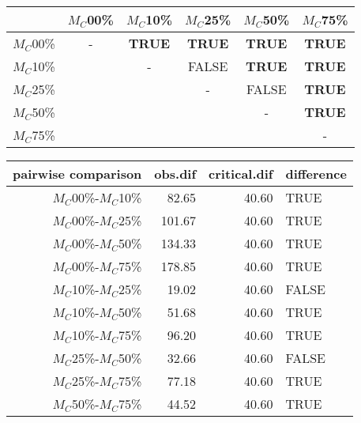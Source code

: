 \begin{tabular}{c|ccccc}
    \hline
              & $M_C$00\% & $M_C$10\% & $M_C$25\% & $M_C$50\% & $M_C$75\% \\
    \hline
    $M_C$00\% & - & \textbf{TRUE} & \textbf{TRUE} & \textbf{TRUE} & \textbf{TRUE}\\
    $M_C$10\% & & - & FALSE & \textbf{TRUE} & \textbf{TRUE} \\
    $M_C$25\% & & & - & FALSE & \textbf{TRUE} \\
    $M_C$50\% & & & & - & \textbf{TRUE} \\
    $M_C$75\% & & & & & - \\
    \hline
\end{tabular}
\centering
\begin{tabular}{rrrl}
 pairwise comparison & obs.dif & critical.dif & difference \\ 
  \hline
  $M_C$00\%-$M_C$10\% & 82.65 & 40.60 & TRUE \\ 
  $M_C$00\%-$M_C$25\% & 101.67 & 40.60 & TRUE \\
  $M_C$00\%-$M_C$50\% & 134.33 & 40.60 & TRUE \\ 
  $M_C$00\%-$M_C$75\% & 178.85 & 40.60 & TRUE \\
  $M_C$10\%-$M_C$25\% & 19.02 & 40.60 & FALSE \\ 
  $M_C$10\%-$M_C$50\% & 51.68 & 40.60 & TRUE \\ 
  $M_C$10\%-$M_C$75\% & 96.20 & 40.60 & TRUE \\ 
  $M_C$25\%-$M_C$50\% & 32.66 & 40.60 & FALSE \\
  $M_C$25\%-$M_C$75\% & 77.18 & 40.60 & TRUE \\
  $M_C$50\%-$M_C$75\% & 44.52 & 40.60 & TRUE \\ 
   \hline
\end{tabular}